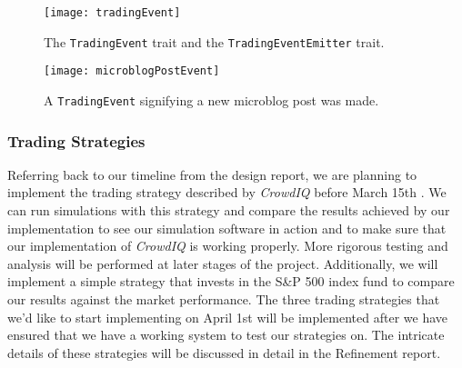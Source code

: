 \begin{figure}[h]
  \label{tradingEvent}
  \begin{center}
    \texttt{[image: tradingEvent]}
  \end{center}
  \caption{The \texttt{TradingEvent} trait and the \texttt{TradingEventEmitter} trait.}
\end{figure}

\begin{figure}[h]
  \label{microblogPostEvent}
  \begin{center}
    \texttt{[image: microblogPostEvent]}
  \end{center}
  \caption{A \texttt{TradingEvent} signifying a new microblog post was made.}
\end{figure}

\subsubsection{Trading Strategies}

Referring back to our timeline from the design report, we are planning to implement the trading strategy described by \textit{CrowdIQ} before March 15th \cite{crowdiq}. We can run simulations with this strategy and compare the results achieved by our implementation to see our simulation software in action and to make sure that our implementation of \textit{CrowdIQ} is working properly. More rigorous testing and analysis will be performed at later stages of the project. Additionally, we will implement a simple strategy that invests in the S\&P 500 index fund to compare our results against the market performance. The three trading strategies that we'd like to start implementing on April 1st will be implemented after we have ensured that we have a working system to test our strategies on. The intricate details of these strategies will be discussed in detail in the Refinement report.


